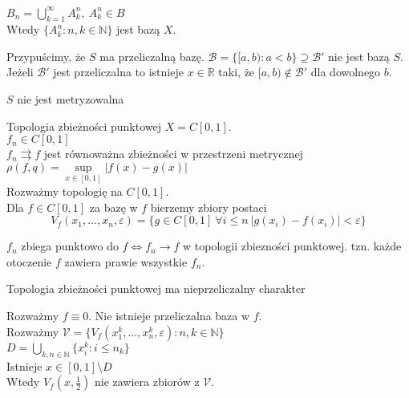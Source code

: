 \begin{prz}
\begin{itemize}
\begin{lem}
\begin{enumerate}[(1)]
\begin{dd}
                            $B_n = \bigcup\limits_{k=1}^\infty A_k^n,\ A_k^n \in B$ \\ 
                            Wtedy $\{ A^n_k : n, k \in \mathbb N\}$ jest bazą $X$.
                        \end{dd} 
                \end{enumerate}
            \end{lem} 
            \begin{dd} 
                Przypuścimy, że $S$ ma przeliczalną bazę. $\mathcal B = \{[a,b) : a < b \} \supseteq \mathcal B'$
                nie jest bazą $S$. Jeżeli $\mathcal B'$ jest przeliczalna to istnieje $x \in \mathbb R$ taki, że 
                $[a,b) \notin \mathcal B'$ dla dowolnego $b$.
            \end{dd} 
    \end{itemize} 
\end{prz}
\begin{wn} $S$ nie jest metryzowalna \end{wn} 
\begin{prz} 
    Topologia zbieżności punktowej $X = C[0,1]$. \\ 
    $f_n \in C[0,1]$ \\ 
    $f_n \rightrightarrows f$ jest równoważna zbieżności w przestrzeni metrycznej\\ 
    $\rho(f,q) = \sup\limits_{x \in [0,1]} |f(x) - g(x)|$ \\ 
    Rozważmy topologię na $C[0,1]$. \\ 
    Dla $f \in C[0,1]$ za bazę w $f$ bierzemy zbiory postaci
    \[ V_f (x_1,\ldots,x_n,\varepsilon) = \{ g \in C[0,1] \ \forall i \le n \ |g(x_i) - f(x_i)| < \varepsilon \} \]
\end{prz}
\begin{tw} 
    $f_n$ zbiega punktowo do $f \Leftrightarrow f_n \to f$ w topologii zbiezności punktowej. 
    tzn. każde otoczenie $f$ zawiera prawie wszystkie $f_n$.
\end{tw}    
\begin{uw} 
    Topologia zbieżności punktowej ma nieprzeliczalny charakter
\end{uw} 
\begin{dd} 
    Rozważmy $f \equiv 0$. Nie istnieje przeliczalna baza w $f$. \\ 
    Rozważmy $\mathcal V = \{ V_f (x_1^k,\ldots,x_n^k,\varepsilon): n,k \in \mathbb N\}$ \\ 
    $D = \bigcup\limits_{k,n \in \mathbb N} \{ x_i^k : i \le n_k \}$ \\ 
    Istnieje $x \in [0,1] \setminus D$ \\ 
    Wtedy $V_f(x,\frac{1}{2})$ nie zawiera zbiorów z $\mathcal V$. 
\end{dd}

